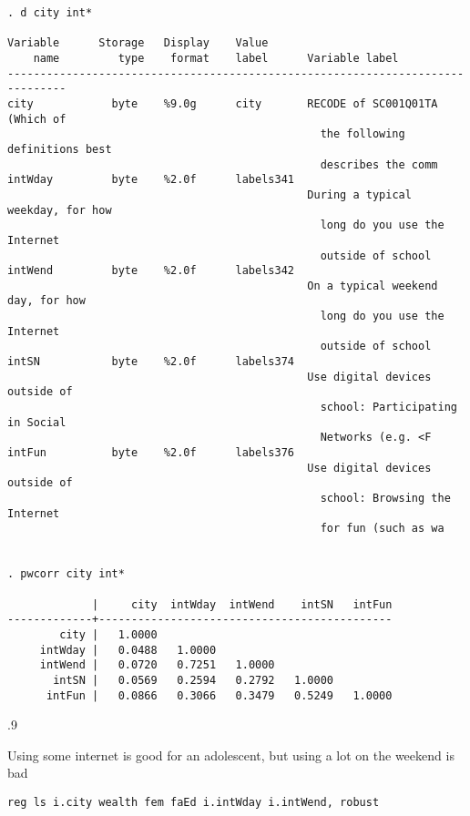 \documentclass[10pt, letterpaper]{article}
\begin{document}
\begin{spacing}{1.4}
\begin{spacing}{.5}
\begin{scriptsize}
\begin{verbatim}
. d city int*

Variable      Storage   Display    Value
    name         type    format    label      Variable label
-------------------------------------------------------------------------------
city            byte    %9.0g      city       RECODE of SC001Q01TA (Which of
                                                the following definitions best
                                                describes the comm
intWday         byte    %2.0f      labels341
                                              During a typical weekday, for how
                                                long do you use the Internet
                                                outside of school
intWend         byte    %2.0f      labels342
                                              On a typical weekend day, for how
                                                long do you use the Internet
                                                outside of school
intSN           byte    %2.0f      labels374
                                              Use digital devices outside of
                                                school: Participating in Social
                                                Networks (e.g. <F
intFun          byte    %2.0f      labels376
                                              Use digital devices outside of
                                                school: Browsing the Internet
                                                for fun (such as wa


. pwcorr city int*

             |     city  intWday  intWend    intSN   intFun
-------------+---------------------------------------------
        city |   1.0000 
     intWday |   0.0488   1.0000 
     intWend |   0.0720   0.7251   1.0000 
       intSN |   0.0569   0.2594   0.2792   1.0000 
      intFun |   0.0866   0.3066   0.3479   0.5249   1.0000 
\end{verbatim}
\end{scriptsize}
\end{spacing}{.9}

Using some internet is good for an adolescent, but using a lot on the weekend is bad


\begin{spacing}{.5}
\begin{scriptsize}
\begin{verbatim}
reg ls i.city wealth fem faEd i.intWday i.intWend, robust


\end{verbatim}
\end{scriptsize}
\end{spacing}
\end{spacing}
\end{document}
